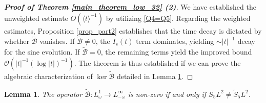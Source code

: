 \documentclass[reqno]{amsart}
\newtheorem{lemma}[theorem]{Lemma}
\numberwithin{equation}{section}
\begin{document}
\begin{proof}[\textbf{Proof of Theorem \ref{main_theorem_low_32} (2)}]  We have established  the unweighted estimate ${O}(\langle t \rangle^{-1})$ by utilizing \eqref{Q4=Q5}.
	Regarding the weighted estimates, Proposition \ref{prop_part2} establishes that the time decay is  dictated by whether $\widetilde{\mathcal{B}}$ vanishes. If $\widetilde{\mathcal{B}} \neq 0$, the $I_s(t)$ term dominates, yielding $\sim |t|^{-1}$ decay for the sine evolution. If $\widetilde{\mathcal{B}} = 0$, the remaining terms yield the improved bound $\mathcal{O}(|t|^{-1} (\log |t|)^{-1})$. The theorem is thus established if we can prove the algebraic characterization of $\ker \widetilde{\mathcal{B}}$ detailed in Lemma \ref{lemma:non-zero_1}.  
\end{proof}  

\begin{lemma}\label{lemma:non-zero_1}  
	The operator $\widetilde{\mathcal{B}} \colon L^1_\omega \to L^\infty_{-\omega}$ is non-zero if and only if $S_5L^2 \neq \widetilde{S}_5L^2$.   
\end{lemma}  
\end{document}
